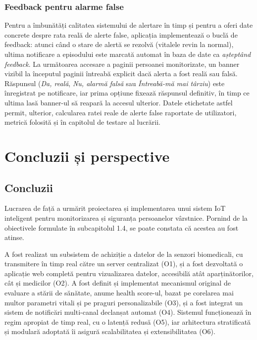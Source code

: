 \documentclass[12pt,a4paper,twoside]{article}
\begin{document}
\subsubsection{Feedback pentru alarme false}

Pentru a îmbunătăți calitatea sistemului de alertare în timp și pentru a oferi date concrete despre rata reală de alerte false, aplicația implementează o buclă de feedback: atunci când o stare de alertă se rezolvă (vitalele revin la normal), ultima notificare a episodului este marcată automat în baza de date ca \textit{așteptând feedback}. La următoarea accesare a paginii persoanei monitorizate, un banner vizibil la începutul paginii întreabă explicit dacă alerta a fost reală sau falsă. Răspunsul (\textit{Da, reală}, \textit{Nu, alarmă falsă} sau \textit{Întreabă-mă mai târziu}) este înregistrat pe notificare, iar prima opțiune fixează răspunsul definitiv, în timp ce ultima lasă banner-ul să reapară la accesul ulterior. Datele etichetate astfel permit, ulterior, calcularea ratei reale de alerte false raportate de utilizatori, metrică folosită și în capitolul de testare al lucrării.


\newpage
\setcounter{section}{6}
\section{Concluzii și perspective}

\subsection{Concluzii}

Lucrarea de față a urmărit proiectarea și implementarea unui sistem IoT inteligent pentru monitorizarea și siguranța persoanelor vârstnice. Pornind de la obiectivele formulate în subcapitolul 1.4, se poate constata că acestea au fost atinse.

A fost realizat un subsistem de achiziție a datelor de la senzori biomedicali, cu transmitere în timp real către un server centralizat (O1), și a fost dezvoltată o aplicație web completă pentru vizualizarea datelor, accesibilă atât aparținătorilor, cât și medicilor (O2). A fost definit și implementat mecanismul original de evaluare a stării de sănătate, anume health score-ul, bazat pe corelarea mai multor parametri vitali și pe praguri personalizabile (O3), și a fost integrat un sistem de notificări multi-canal declanșat automat (O4). Sistemul funcționează în regim apropiat de timp real, cu o latență redusă (O5), iar arhitectura stratificată și modulară adoptată îi asigură scalabilitatea și extensibilitatea (O6).
\end{document}
